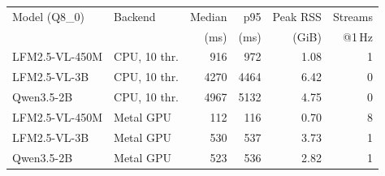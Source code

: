\begin{tabular}{llrrrr}
\toprule
Model (Q8\_0) & Backend & Median & p95 & Peak RSS & Streams \\
 & & (ms) & (ms) & (GiB) & @1\,Hz \\
\midrule
LFM2.5-VL-450M & CPU, 10 thr. & 916 & 972 & 1.08 & 1 \\
LFM2.5-VL-3B & CPU, 10 thr. & 4270 & 4464 & 6.42 & 0 \\
Qwen3.5-2B & CPU, 10 thr. & 4967 & 5132 & 4.75 & 0 \\
\midrule
LFM2.5-VL-450M & Metal GPU & 112 & 116 & 0.70 & 8 \\
LFM2.5-VL-3B & Metal GPU & 530 & 537 & 3.73 & 1 \\
Qwen3.5-2B & Metal GPU & 523 & 536 & 2.82 & 1 \\
\bottomrule
\end{tabular}
